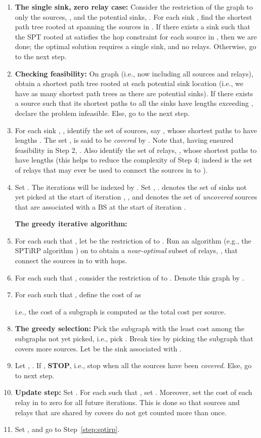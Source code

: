 \documentclass[conference]{IEEEtran}
\newcommand{\gap}{\vspace{2mm}}
\begin{document}
\begin{enumerate}
\item \label{step:zero-relay}\textbf{The single sink, zero relay case: }Consider the restriction of the graph  to only the sources, , and the potential sinks, . For each sink , find the shortest path tree rooted at  spanning the sources in . If there exists a sink  such that the SPT rooted at  satisfies the hop constraint for each source in , then we are done; the optimal solution requires a single sink, and no relays. Otherwise, go to the next step.
\item \label{step:spt}\textbf{Checking feasibility: }On graph  (i.e., now including all sources and relays), obtain a shortest path tree rooted at each potential sink location (i.e., we have as many shortest path trees as there are potential sinks). If there exists a source such that its shortest paths to all the sinks have lengths exceeding , declare the problem infeasible. Else, go to the next step.
\item For each sink , , identify the set of sources, say , whose shortest paths to  have lengths . The set , is said to be \emph{covered} by . Note that, having ensured feasibility in Step 2, . Also identify the set of relays, , whose shortest paths to  have lengths  (this helps to reduce the complexity of Step 4; indeed  is the set of relays that may ever be used to connect the sources in  to ). 
\item Set . The iterations will be indexed by . Set , .  denotes the set of sinks not yet picked at the start of iteration , , and  denotes the set of \emph{uncovered} sources that are associated with a BS  at the start of iteration .

\gap
\noindent
\textbf{The greedy iterative algorithm:}
\item\label{step:sptirp} For each  such that , let  be the restriction of  to . Run an algorithm (e.g., the SPTiRP algorithm \cite{fullpaper}) on  to obtain a \emph{near-optimal} subset of relays, , that connect the sources in  to  with  hops. 
\item For each  such that , consider the restriction of  to . Denote this graph by .
\item For each  such that , define the cost of  as 

i.e., the cost of a subgraph is computed as the total cost per source.
\item \textbf{The greedy selection: }Pick the subgraph with the least cost among the subgraphs not yet picked, i.e., pick . Break ties by picking the subgraph that covers more sources. Let  be the sink associated with . 
\item Let , . If , \textbf{STOP}, i.e., stop when all the sources have been \emph{covered}. Else, go to next step.
\item \textbf{Update step: }Set . For each  such that , set . Moreover, set the cost of each relay in  to zero for all future iterations. This is done so that sources and relays that are shared by covers do not get counted more than once.
\item Set , and go to Step~\ref{step:sptirp}.  
\end{enumerate}
\end{document}
